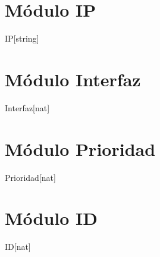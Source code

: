 \section{M\'{o}dulo IP}
  \begin{Representacion}
    \begin{Estructura}{IP}[string]
    \end{Estructura} 
  \end{Representacion}

\section{M\'{o}dulo Interfaz}
  \begin{Representacion}
    \begin{Estructura}{Interfaz}[nat]
    \end{Estructura} 
  \end{Representacion}

\section{M\'{o}dulo Prioridad}
  \begin{Representacion}
    \begin{Estructura}{Prioridad}[nat]
    \end{Estructura} 
  \end{Representacion}

\section{M\'{o}dulo ID}
  \begin{Representacion}
    \begin{Estructura}{ID}[nat]
    \end{Estructura} 
  \end{Representacion}


